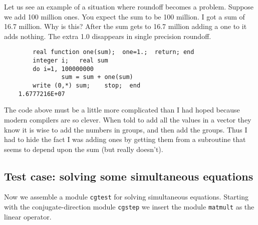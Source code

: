 \par
Let us see an example of a situation where roundoff becomes a problem.
Suppose we add 100 million ones.  You expect the sum to be 100 million.
I got a sum of 16.7 million.
Why is this?
After the sum gets to 16.7 million adding a one to it adds nothing.
The extra 1.0 disappears in single precision roundoff.
\par
\begin{verbatim}
        real function one(sum);  one=1.;  return; end
        integer i;   real sum
        do i=1, 100000000
                sum = sum + one(sum)
        write (0,*) sum;    stop;  end
	1.6777216E+07
\end{verbatim}
\par
The code above must be a little more complicated than I had hoped
because modern compilers are so clever.
When told to add all the values in a vector they know
it is wise to add the numbers in groups, and then add the groups.
Thus I had to hide the fact I was adding ones by getting them
from a subroutine that seems to depend upon the sum (but really doesn't).


\begin{comment}
\subsection{Why C is much better than Fortran 77}
I'd like to digress from our geophysics-mathematics themes
to explain why C has been a great step forward
over Fortran 77.
All the illustrations in this book were originally computed in F77.
Then module
\texttt{tinysolver} \vpageref{lst:tinysolver}
was simply a subroutine.
It was not one module for the whole book, as it is now,
but it was many conceptually identical subroutines,
dozens of them, one subroutine for each application.
The reason for the proliferation was that F77 lacks the ability of C
to represent operators as having two ways to enter,
one for science and another for math.
On the other hand, F77 did not require the half a page
of definitions that we see here in C.
But the definitions are not difficult to understand,
and they are a clutter that we must see once and never again.
Another benefit is that the book in F77 had no easy way to switch
from the \texttt{cgstep} solver to other solvers.
\end{comment}

\subsection{Test case: solving some simultaneous equations}
\par
Now we assemble a module \texttt{cgtest} for solving simultaneous equations.
Starting with the conjugate-direction module {\tt cgstep} 
we insert the module \texttt{matmult}  as the linear operator.

